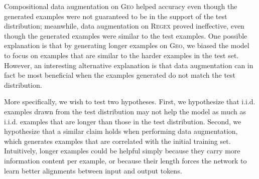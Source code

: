 \documentclass[11pt,letterpaper]{article}
\newcommand{\regex}{\textsc{Regex}\xspace}
\newcommand{\geo}{\textsc{Geo}\xspace}
\begin{document}
Compositional data augmentation on \geo helped accuracy
even though the generated examples were not guaranteed
to be in the support of the test distribution;
meanwhile, data augmentation on \regex 
proved ineffective, even though 
the generated examples were similar to the test examples. 
One possible explanation is that by generating longer examples on
\geo, we biased the model to focus on examples that are similar to the
harder examples in the test set.
However, an interesting alternative explanation is that
data augmentation can in fact be most beneficial when the examples generated
do not match the test distribution.

More specifically, we wish to test two hypotheses.
First, we hypothesize that i.i.d. examples drawn from the test distribution 
may not help the model as much as i.i.d. examples
that are longer than those in the test distribution.
Second, we hypothesize that 
a similar claim holds when performing data augmentation,
which generates examples that are correlated with the initial training set.
Intuitively, longer examples could be helpful 
simply because they carry more information content per example,
or because their length forces the network to learn better alignments between
input and output tokens.
\end{document}
